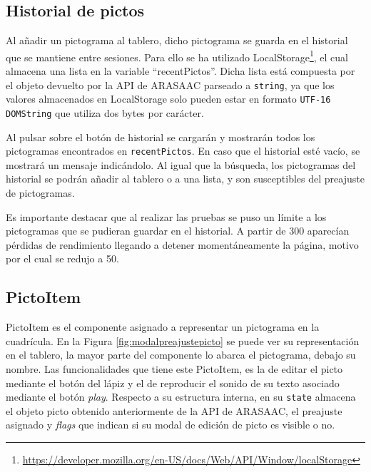 \subsection{Historial de pictos}

Al añadir un pictograma al tablero, dicho pictograma se guarda en el historial que se mantiene entre sesiones. Para ello se ha utilizado LocalStorage\footnote{\url{https://developer.mozilla.org/en-US/docs/Web/API/Window/localStorage}}, el cual almacena una lista en la variable “recentPictos”. Dicha lista está compuesta por el objeto devuelto por la API de ARASAAC parseado a \texttt{string}, ya que los valores almacenados en LocalStorage solo pueden estar en formato \texttt{UTF-16 DOMString} que utiliza dos bytes por carácter.

Al pulsar sobre el botón de historial se cargarán y mostrarán todos los pictogramas encontrados en \texttt{recentPictos}. En caso que el historial esté vacío, se mostrará un mensaje indicándolo. Al igual que la búsqueda, los pictogramas del historial se podrán añadir al tablero o a una lista, y son susceptibles del preajuste de pictogramas.

Es importante destacar que al realizar las pruebas se puso un límite a los pictogramas que se pudieran guardar en el historial. A partir de 300 aparecían pérdidas de rendimiento llegando a detener momentáneamente la página, motivo por el cual se redujo a 50.

\subsection{PictoItem}

PictoItem es el componente asignado a representar un pictograma en la cuadrícula. En la Figura \ref{fig:modalpreajustepicto} se puede ver su representación en el tablero, la mayor parte del componente lo abarca el pictograma, debajo su nombre. Las funcionalidades que tiene este PictoItem, es la de editar el picto mediante el botón del lápiz y el de reproducir el sonido de su texto asociado mediante el botón \textit{play}. Respecto a su estructura interna, en su \texttt{state} almacena el objeto picto obtenido anteriormente de la API de ARASAAC, el preajuste asignado y \textit{flags} que indican si su modal de edición de  picto es visible o no. 


